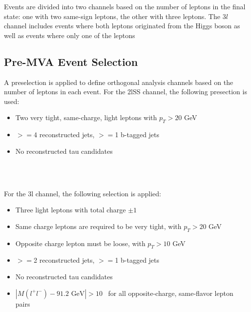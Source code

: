Events are divided into two channels based on the number of leptons in the final state: one with two same-sign leptons, the other with three leptons. The $3l$ channel includes events where both leptons originated from the Higgs boson as well as events where only one of the leptons 


\subsection{Pre-MVA Event Selection}
\label{subsec:preMVA}

A preselection is applied to define orthogonal analysis channels based on the number of leptons in each event. For the 2lSS channel, the following presection is used:

\begin{itemize}
  \item Two very tight, same-charge, light leptons with $p_T > 20$ GeV
  \item $>=$4 reconstructed jets, $>=$1 b-tagged jets
  \item No reconstructed tau candidates
\end{itemize}

\begin{figure}[h!]
    \\
    \\
    \caption{}                           
    \label{fig:presel2lSS}
\end{figure}

For the 3l channel, the following selection is applied:

\begin{itemize}
  \item Three light leptons with total charge $\pm 1$
  \item Same charge leptons are required to be very tight, with $p_T > 20$ GeV
  \item Opposite charge lepton must be loose, with $p_T > 10$ GeV
  \item $>=$2 reconstructed jets, $>=$1 b-tagged jets                                                                        
  \item No reconstructed tau candidates
  \item $|M(l^+l^-)-91.2\textrm{ GeV}| > 10$~\GeV{} for all opposite-charge, same-flavor lepton pairs
\end{itemize}

